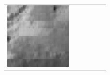 \documentclass[11pt,a4paper,openright,oneside]{book}
\numberwithin{equation}{section}
\begin{document}
{\begin{figure}[h]
\begin{adjustwidth}{-3cm}{-3cm}
\begin{tabular}{>{\centering\arraybackslash}m{1.5cm} m{2.5cm} m{2.5cm} m{2.5cm} m{2.5cm} m{2.5cm}}
        \includegraphics[width=\linewidth]{media/tnale/AAAfruits-comp5-ale-1.png} \\
        

\end{tabular}
\end{adjustwidth}
\end{figure}}
\end{document}
